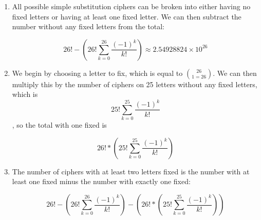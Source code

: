 \documentclass[12pt]{amsart}
\theoremstyle{definition}
\begin{document}
\begin{enumerate}
\begin{enumerate}
\begin{enumerate}
                    \item All possible simple substitution ciphers can be broken into either having no fixed letters or having at least one fixed letter. We can then subtract the number without any fixed letters from the total:
                    \begin{center}
                        \[26! - ( 26! \sum_{k=0}^{26} \frac{(-1)^k}{k!} ) \approx 2.54928824\times10^{26}\]
                    \end{center}

                    \item We begin by choosing a letter to fix, which is equal to $26 \choose 1 = 26$. We can then multiply this by the number of ciphers on 25 letters without any fixed letters, which is \[ 25! \sum_{k=0}^{25} \frac{(-1)^k}{k!} \], so the total with one fixed is 
                    \begin{center}
                        \[ 26! * (25! \sum_{k=0}^{25} \frac{(-1)^k}{k!}) \]
                    \end{center}

                    \item The number of ciphers with at least two letters fixed is the number with at least one fixed minus the number with exactly one fixed:
                    \begin{center}
                        \[26! - ( 26! \sum_{k=0}^{26} \frac{(-1)^k}{k!} ) - ( 26! * (25! \sum_{k=0}^{25} \frac{(-1)^k}{k!}) )\]
                    \end{center}
                \end{enumerate}
            \end{enumerate}
            
\end{enumerate}
\end{document}
